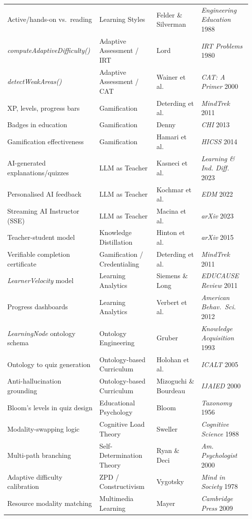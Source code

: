 \begin{longtable}{@{}p{3cm}p{3cm}p{3.5cm}p{3cm}@{}}
Active/hands-on vs.\ reading & Learning Styles & Felder \& Silverman~\cite{felder1988} & \emph{Engineering Education} 1988 \\
\emph{computeAdaptiveDifficulty()} & Adaptive Assessment / IRT & Lord~\cite{lord1980} & \emph{IRT Problems} 1980 \\
\emph{detectWeakAreas()} & Adaptive Assessment / CAT & Wainer et al.~\cite{wainer2000} & \emph{CAT: A Primer} 2000 \\
XP, levels, progress bars & Gamification & Deterding et al.~\cite{deterding2011} & \emph{MindTrek} 2011 \\
Badges in education & Gamification & Denny~\cite{denny2013} & \emph{CHI} 2013 \\
Gamification effectiveness & Gamification & Hamari et al.~\cite{hamari2014} & \emph{HICSS} 2014 \\
AI-generated explanations/quizzes & LLM as Teacher & Kasneci et al.~\cite{kasneci2023} & \emph{Learning \& Ind. Diff.} 2023 \\
Personalised AI feedback & LLM as Teacher & Kochmar et al.~\cite{kochmar2022} & \emph{EDM} 2022 \\
Streaming AI Instructor (SSE) & LLM as Teacher & Macina et al.~\cite{macina2023} & \emph{arXiv} 2023 \\
Teacher-student model & Knowledge Distillation & Hinton et al.~\cite{hinton2015} & \emph{arXiv} 2015 \\
Verifiable completion certificate & Gamification / Credentialing & Deterding et al.~\cite{deterding2011} & \emph{MindTrek} 2011 \\
\emph{LearnerVelocity} model & Learning Analytics & Siemens \& Long~\cite{siemens2011} & \emph{EDUCAUSE Review} 2011 \\
Progress dashboards & Learning Analytics & Verbert et al.~\cite{verbert2012} & \emph{American Behav.\ Sci.} 2012 \\
\emph{LearningNode} ontology schema & Ontology Engineering & Gruber~\cite{gruber1993} & \emph{Knowledge Acquisition} 1993 \\
Ontology to quiz generation & Ontology-based Curriculum & Holohan et al.~\cite{holohan2005} & \emph{ICALT} 2005 \\
Anti-hallucination grounding & Ontology-based Curriculum & Mizoguchi \& Bourdeau~\cite{mizoguchi2000} & \emph{IJAIED} 2000 \\
Bloom's levels in quiz design & Educational Psychology & Bloom~\cite{bloom1956} & \emph{Taxonomy} 1956 \\
Modality-swapping logic & Cognitive Load Theory & Sweller~\cite{sweller1988} & \emph{Cognitive Science} 1988 \\
Multi-path branching & Self-Determination Theory & Ryan \& Deci~\cite{ryan2000} & \emph{Am. Psychologist} 2000 \\
Adaptive difficulty calibration & ZPD / Constructivism & Vygotsky~\cite{vygotsky1978} & \emph{Mind in Society} 1978 \\
Resource modality matching & Multimedia Learning & Mayer~\cite{mayer2009} & \emph{Cambridge Press} 2009 \\
\end{longtable}

